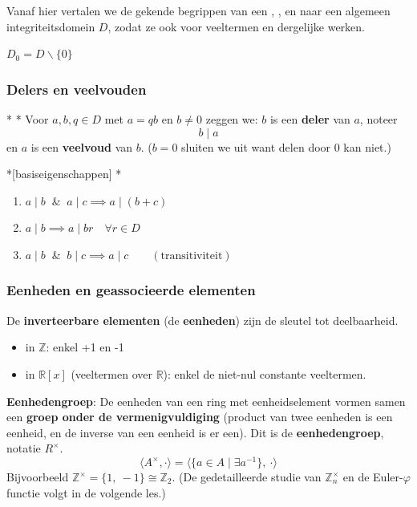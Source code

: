 Vanaf hier vertalen we de gekende begrippen van een , , en  naar een algemeen integriteitsdomein $D$, zodat ze ook voor veeltermen en dergelijke werken.

\textbf{} $D_0 = D\backslash \{0\}$

\subsubsection{Delers en veelvouden}

\begin{nicedefinition}*
    \nextpart[]*
    Voor $a,b,q \in D$ met $a = qb$ en $b \neq 0$ zeggen we: $b$ is een \textcolor{PineGreen!75!black}{\textbf{deler}} van $a$, noteer
    \begin{equation*}
        b \mid a
    \end{equation*}
    en $a$ is een \textcolor{PineGreen!75!black}{\textbf{veelvoud}} van $b$. ($b=0$ sluiten we uit want delen door $0$ kan niet.)
\end{nicedefinition}

\begin{niceproperty}*[basiseigenschappen]
    \nextpart[]*
    \begin{enumerate}
        \item $a \mid b \;\; \& \;\; a \mid c \implies a \mid (b+c)$
        \item $a \mid b \implies a \mid br \quad \forall r \in D$
        \item $a \mid b \;\; \& \;\; b \mid c \implies a \mid c \qquad (\text{transitiviteit})$
    \end{enumerate}
\end{niceproperty}

\subsubsection{Eenheden en geassocieerde elementen}

De \textbf{inverteerbare elementen} (de \textbf{eenheden}) zijn de sleutel tot deelbaarheid.
\begin{itemize}
    \item in $\mathbb{Z}$: enkel +1 en -1
    \item in $\mathbb{R}[x]$ (veeltermen over $\mathbb{R}$): enkel de niet-nul constante veeltermen.
\end{itemize}

\textbf{Eenhedengroep}: De eenheden van een ring met eenheidselement vormen samen een \textbf{groep onder de vermenigvuldiging} (product van twee eenheden is een eenheid, en de inverse van een eenheid is er een). Dit is de \textbf{eenhedengroep}, notatie $R^{\times}$.
\begin{equation*}
    \langle A^{\times}, \cdot \rangle = \langle \{a \in A \mid \exists a^{-1}\},\ \cdot \rangle
\end{equation*}
Bijvoorbeeld $\mathbb{Z}^{\times} = \{1,\ -1\} \cong \mathbb{Z}_2$. (De gedetailleerde studie van $\mathbb{Z}_n^{\times}$ en de Euler-$\varphi$ functie volgt in de volgende les.)

